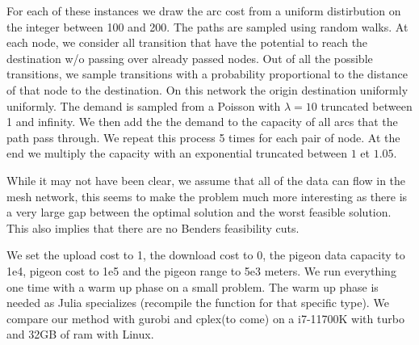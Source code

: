 \documentclass{article}
\begin{document}
	For each of these instances we draw the arc cost from a uniform distirbution on the integer between 100 and 200. The paths are sampled using random walks. At each node, we consider all transition that have the potential to reach the destination w/o passing over already passed nodes. Out of all the possible transitions, we sample transitions with a probability proportional to the distance of that node to the destination. On this network the origin destination uniformly uniformly. The demand is sampled from a Poisson with $\lambda=10$ truncated between 1 and infinity. We then add the the demand to the capacity of all arcs that the path pass through. We repeat this process 5 times for each pair of node. At the end we multiply the capacity with an exponential truncated between $1$ et $1.05$.
	
	
	While it may not have been clear, we assume that all of the data can flow in the mesh network, this seems to make the problem much more interesting as there is a very large gap between the optimal solution and the worst feasible solution. This also implies that there are no Benders feasibility cuts.
	
	
	We set the upload cost to 1, the download cost to 0, the pigeon data capacity to 1e4, pigeon cost to 1e5 and the pigeon range to 5e3 meters. We run everything one time with a warm up phase on a small problem. The warm up phase is needed as Julia specializes (recompile the function for that specific type). We compare our method with gurobi and cplex(to come) on a i7-11700K with turbo and 32GB of ram with Linux.
	
\end{document}
